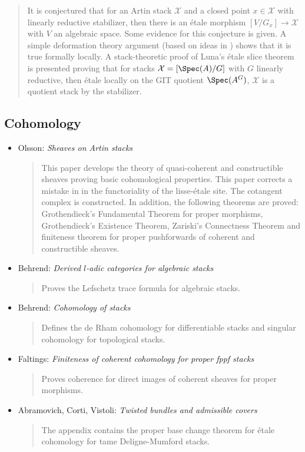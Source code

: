 \begin{itemize}
\begin{quote}
It is conjectured that for an Artin stack $\mathcal{X}$ and a closed point $x
\in \mathcal{X}$
with linearly reductive stabilizer, then there is an \'etale morphism $[V/G_x]
\to \mathcal{X}$ with $V$ an algebraic space. Some evidence for this
conjecture is
given. A simple deformation theory argument (based on ideas in \cite{tame})
shows that it is true formally locally. A stack-theoretic proof of Luna's
\'etale slice theorem is presented proving that for stacks
$\mathcal{X} = [\Spec(A)/G]$
with $G$ linearly reductive, then \'etale locally on the GIT quotient
$\Spec(A^G)$, $\mathcal{X}$ is a quotient stack by the stabilizer.
\end{quote}
\end{itemize}

\subsection{Cohomology}
\label{subsection-cohomology}

\begin{itemize}
\item Olsson: \emph{Sheaves on Artin stacks} \cite{olsson_sheaves}
\begin{quote}
This paper develops the theory of quasi-coherent and constructible sheaves
proving basic cohomological properties. This paper corrects a mistake in
\cite{LM-B} in the functoriality of the lisse-\'etale site. The cotangent
complex is constructed. In addition, the following theorems are proved:
Grothendieck's Fundamental Theorem for proper morphisms, Grothendieck's
Existence Theorem, Zariski's Connectness Theorem and finiteness theorem
for proper pushforwards of coherent and constructible sheaves.
\end{quote}
\item Behrend: \emph{Derived $l$-adic categories for algebraic stacks}
\cite{behrend_derived}
\begin{quote}
Proves the Lefschetz trace formula for algebraic stacks.
\end{quote}
\item Behrend: \emph{Cohomology of stacks} \cite{behrend_cohomology}
\begin{quote}
Defines the de Rham cohomology for differentiable stacks and singular
cohomology for topological stacks.
\end{quote}
\item Faltings:
\emph{Finiteness of coherent cohomology for proper fppf stacks}
\cite{faltings_finiteness}
\begin{quote}
Proves coherence for direct images of coherent sheaves for proper morphisms.
\end{quote}
\item Abramovich, Corti, Vistoli:
\emph{Twisted bundles and admissible covers} \cite{acv}
\begin{quote}
The appendix contains the proper base change theorem for \'etale cohomology
for tame Deligne-Mumford stacks.
\end{quote}
\end{itemize}


